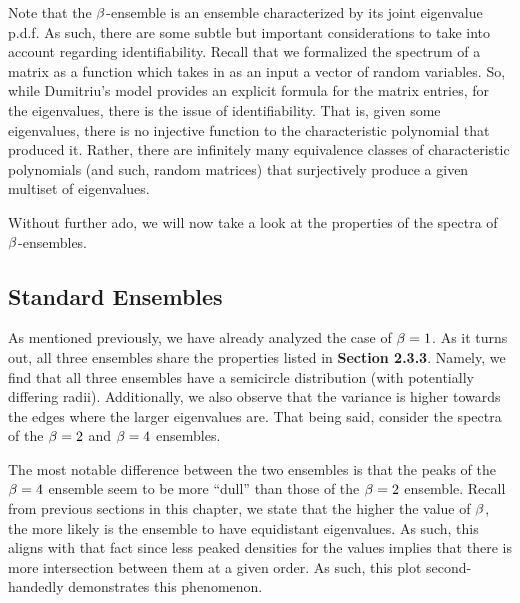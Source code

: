 \begin{remark}
Note that the  $\beta$-ensemble is an ensemble characterized by its joint eigenvalue p.d.f.
As such, there are some subtle but important considerations to take into account regarding identifiability.
Recall that we formalized the spectrum of a matrix as a function which takes in as an input a vector of random variables.
So, while Dumitriu's model provides an explicit formula for the matrix entries, for the eigenvalues, there is the issue of identifiability.
That is, given some eigenvalues, there is no injective function to the characteristic polynomial that produced it.
Rather, there are infinitely many equivalence classes of characteristic polynomials (and such, random matrices) that surjectively produce a given multiset of eigenvalues.
\end{remark}

Without further ado, we will now take a look at the properties of the spectra of $\beta$-ensembles.


\subsection{Standard Ensembles}

As mentioned previously, we have already analyzed the case of $\beta = 1$. As it turns out, all three ensembles share the properties listed in \textbf{Section 2.3.3}. Namely, we find that all three ensembles have a semicircle distribution (with potentially differing radii). Additionally, we also observe that the variance is higher towards the edges where the larger eigenvalues are. That being said, consider the spectra of the $\beta = 2$ and $\beta = 4$ ensembles.
\trim
{}

\newpage

The most notable difference between the two ensembles is that the peaks of the $\beta = 4$ ensemble seem to be more ``dull'' than those of the $\beta = 2$ ensemble. Recall from previous sections in this chapter, we state that the higher the value of $\beta$, the more likely is the ensemble to have equidistant eigenvalues. As such, this aligns with that fact since less peaked densities for the values implies that there is more intersection between them at a given order. As such, this plot second-handedly demonstrates this phenomenon.

